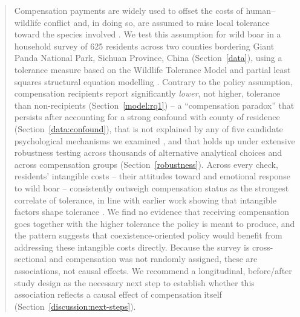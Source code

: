 \documentclass[12pt]{article}
\begin{document}
\begin{abstract}

Compensation payments are widely used to offset the costs of human--wildlife
conflict \citep{Konig2020, Madden2004} and, in doing so, are assumed to raise
local tolerance toward the species involved \citep{Hemminger2025, Kichloo2023}.
We test this assumption for wild boar in a household survey of 625 residents
across two counties bordering Giant Panda National Park, Sichuan Province,
China (Section~\ref{data}), using a tolerance measure based on the Wildlife
Tolerance Model \citep{Kansky2016} and partial least squares structural
equation modelling \citep{Rseminr}. Contrary to the policy assumption,
compensation recipients report significantly \emph{lower}, not higher,
tolerance than non-recipients (Section~\ref{model:rq1}) -- a ``compensation
paradox'' that persists after accounting for a strong confound with county of
residence (Section~\ref{data:confound}), that is not explained by any of five
candidate psychological mechanisms we examined
\citep[mediation tests following][]{Nitzl2016}, and that holds up under
extensive robustness testing across thousands of alternative analytical
choices \citep[specification-vibration analysis following][]{Patel2015} and
across compensation groups (Section~\ref{robustness}). Across every check,
residents' intangible costs -- their attitudes toward and emotional response to
wild boar -- consistently outweigh compensation status as the strongest
correlate of tolerance, in line with earlier work showing that intangible
factors shape tolerance \citep{KanskyKnight2014, KanskyKidd2024}. We find no
evidence that receiving compensation goes together with the higher tolerance
the policy is meant to produce, and the pattern suggests that
coexistence-oriented policy would benefit from addressing these intangible
costs directly. Because the survey is cross-sectional and compensation was not
randomly assigned, these are associations, not causal effects. We recommend a
longitudinal, before/after study design as the necessary next step to
establish whether this association reflects a causal effect of compensation
itself (Section~\ref{discussion:next-steps}).

\end{abstract}

\newpage
\tableofcontents
\newpage


    
\end{document}
